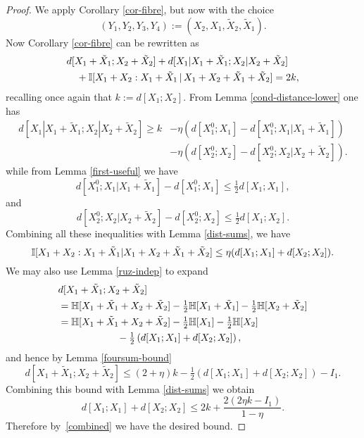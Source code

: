 \begin{proof}
  \leanok
  We apply Corollary \ref{cor-fibre}, but now with the choice
  \[
    (Y_1,Y_2,Y_3,Y_4) := (X_2, X_1, \tilde X_2, \tilde X_1).
  \]
  Now Corollary \ref{cor-fibre} can be rewritten as
  \begin{align*}
    &d[X_1+\tilde X_1;X_2+\tilde X_2] + d[X_1|X_1+\tilde X_1; X_2|X_2+\tilde X_2] \\
    &\quad + \mathbb{I}[X_1+X_2 : X_1 + \tilde X_1 \,|\, X_1+X_2+\tilde X_1+\tilde X_2] = 2k,
  \end{align*}
  recalling once again that $k := d[X_1;X_2]$.  From Lemma \ref{cond-distance-lower} one has
  \begin{align*}
    d[X_1|X_1+\tilde X_1; X_2|X_2+\tilde X_2]   \geq k &- \eta (d[X^0_1;X_1] - d[X^0_1;X_1|X_1+\tilde X_1]) \\& - \eta (d[X^0_2;X_2] - d[X^0_2;X_2|X_2+\tilde X_2]) .
  \end{align*}
  while from Lemma \ref{first-useful} we have
  \[
    d[X^0_1;X_1|X_1+\tilde X_1] -  d[X^0_1;X_1] \leq  \tfrac{1}{2} d[X_1;X_1],
  \]
  and
  \[
    d[X^0_2;X_2|X_2+\tilde X_2] -  d[X^0_2;X_2] \leq \tfrac{1}{2} d[X_1;X_2].
    \]
  Combining all these inequalities with Lemma \ref{dist-sums}, we have
  \begin{equation}\label{combined}
  \mathbb{I}[X_1+X_2 : X_1 + \tilde X_1 | X_1+X_2+\tilde X_1+\tilde X_2] \leq \eta ( d[X_1; X_1] + d[X_2; X_2] ).
  \end{equation}
  We may also use Lemma \ref{ruz-indep} to expand
  \begin{align*}
   & d[X_1+\tilde X_1;X_2+\tilde X_2] \\ &= \mathbb{H}[X_1+\tilde X_1 + X_2 + \tilde X_2]  - \tfrac{1}{2} \mathbb{H}[X_1+\tilde X_1] - \tfrac{1}{2} \mathbb{H}[X_2+\tilde X_2] \\
    &= \mathbb{H}[X_1+\tilde X_1 + X_2 + \tilde X_2]  - \tfrac{1}{2} \mathbb{H}[X_1] - \tfrac{1}{2} \mathbb{H}[X_2]  \\ & \qquad\qquad\qquad   - \tfrac{1}{2} \left( d[X_1;X_1] + d[X_2; X_2] \right),
  \end{align*}
  and hence by Lemma \ref{foursum-bound}
  \[
    d[X_1+\tilde X_1; X_2+\tilde X_2] \leq (2+\eta) k - \tfrac{1}{2} \left( d[X_1;X_1] + d[X_2;X_2] \right) - I_1.
  \]
  Combining this bound with Lemma \ref{dist-sums} we obtain
  \[d[X_1;X_1] + d[X_2;X_2] \leq 2 k + \frac{2(2 \eta k - I_1)}{1-\eta}. \]
  Therefore by~\eqref{combined} we have the desired bound.
\end{proof}


